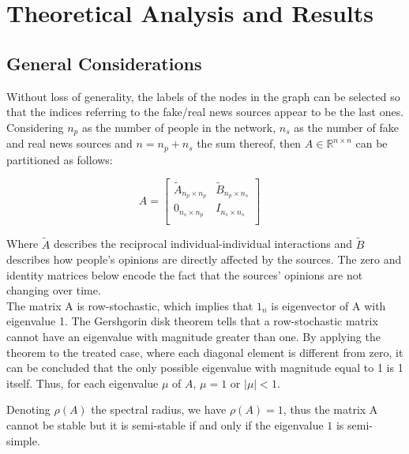 \section{Theoretical Analysis and Results}
\subsection{General Considerations}
Without loss of generality, the labels of the nodes in the graph can be selected so that the indices referring to the fake/real news sources appear to be the last ones. Considering $n_p$ as the number of people in the network, $n_s$ as the number of fake and real news sources and $n = n_p + n_s$ the sum thereof, then $A \in \mathbb{R}^{ n \times n}$ can be partitioned as follows:

$$
A = 
\begin{bmatrix}
	\tilde{A}_{n_p \times n_p} & \tilde{B}_{n_p \times n_s} \\
	0_{n_s \times n_p} & I_{n_s \times n_s} \\
\end{bmatrix} 
\quad
$$

Where $\tilde{A}$ describes the reciprocal individual-individual interactions and $\tilde{B}$ describes how people's opinions are directly affected by the sources. The zero and identity matrices below encode the fact that the sources' opinions are not changing over time.\\

The matrix A is row-stochastic, which implies that $1_n$ is eigenvector of A with eigenvalue 1. The Gershgorin disk theorem tells that a row-stochastic matrix cannot have an eigenvalue with magnitude greater than one. By applying the theorem to the treated case, where each diagonal element is different from zero, it can be concluded that the only possible eigenvalue with magnitude equal to 1 is 1 itself. Thus, for each eigenvalue $\mu$ of $A$, $\mu=1$ or $|\mu|<1$.



Denoting $\rho(A)$ the spectral radius, we have $\rho(A) = 1$, thus the matrix A cannot be stable but it is semi-stable if and only if the eigenvalue $1$ is semi-simple.

